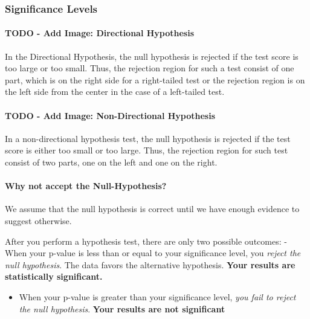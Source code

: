 \documentclass[11pt]{article}
\providecommand{\tightlist}{%
      \setlength{\itemsep}{0pt}\setlength{\parskip}{0pt}}
\begin{document}
\hypertarget{significance-levels}{%
\subsubsection{Significance Levels}\label{significance-levels}}


\hypertarget{directional-hypothesis}{%
\paragraph{TODO - Add Image: Directional Hypothesis}\label{directional-hypothesis}}

In the Directional Hypothesis, the null hypothesis is rejected if the
test score is too large or too small. Thus, the rejection region for
such a test consist of one part, which is on the right side for a
right-tailed test or the rejection region is on the left side from the
center in the case of a left-tailed test.

\hypertarget{non-directional-hypothesis}{%
\paragraph{TODO - Add Image: Non-Directional Hypothesis}\label{non-directional-hypothesis}}

In a non-directional hypothesis test, the null hypothesis is rejected if
the test score is either too small or too large. Thus, the rejection
region for such test consist of two parts, one on the left and one on
the right.

\hypertarget{why-not-accept-the-null-hypothesis}{%
\paragraph{Why not accept the Null-Hypothesis?}\label{why-not-accept-the-null-hypothesis}}

We assume that the null hypothesis is correct until we have enough
evidence to suggest otherwise.

After you perform a hypothesis test, there are only two possible
outcomes: - When your p-value is less than or equal to your significance
level, you \emph{reject the null hypothesis}. The data favors the
alternative hypothesis. \textbf{Your results are statistically
significant.}

\begin{itemize}
\tightlist
\item
  When your p-value is greater than your significance level, \emph{you
  fail to reject the null hypothesis}. \textbf{Your results are not
  significant}
\end{itemize}
\end{document}
